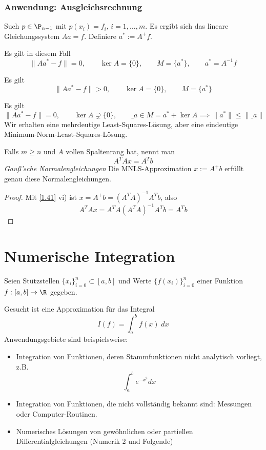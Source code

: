 \documentclass[11pt]{scrartcl}
\begin{document}
\subsubsection{Anwendung: Ausgleichsrechnung}

Such $p\in \P_{n-1}$ mit $p(x_i)=f_i$, $i=1,\dotsc,m$.
Es ergibt sich das lineare Gleichungssystem $Aa = f$.
Definiere $a^* := A^+f$.

\begin{seg}[$m=n$ (Polynominterpolation)]
	Es gilt in diesem Fall
	\[
		\|Aa^*-f\| = 0, \qquad \ker A = \{0\}, \qquad M = \{a^*\}, \qquad a^* = A^{-1}f
	\]
\end{seg}
\begin{seg}[$m>n$]
	Es gilt
	\[
		\|Aa^*-f\| > 0, \qquad \ker A = \{0\}, \qquad M = \{a^*\}
	\]
\end{seg}
\begin{seg}[$m<n$]
	Es gilt
	\[
		\|Aa^*-f\| = 0, \qquad \ker A \supsetneq \{0\}, \qquad \_a \in M = a^* + \ker A \implies \|a^*\| \le \|\_a\|
	\]
	Wir erhalten eine mehrdeutige Least-Squares-Lösung, aber eine eindeutige Minimum-Norm-Least-Squares-Lösung.
\end{seg}
\begin{nt*}
	Falls $m\ge n$ und $A$ vollen Spaltenrang hat, nennt man
	\[
		A^TAx = A^Tb
	\]
	\emph{Gauß'sche Normalengleichungen}
	Die MNLS-Approximation $x:=A^+b$ erfüllt genau diese Normalengleichungen.
	\begin{proof}
		Mit \ref{1.41} vi) ist $x=A^+b = (A^TA)^{-1}A^Tb$, also
		\[
			A^TAx = A^TA(A^TA)^{-1}A^T b = A^Tb
		\]
	\end{proof}
\end{nt*}



\section{Numerische Integration}	



Seien Stützstellen $\{x_i\}_{i=0}^n \subset [a,b]$ und Werte $\{f(x_i)\}_{i=0}^n$ einer Funktion $f:[a,b]\to \R$ gegeben.

Gesucht ist eine Approximation für das Integral
\[
	I(f) = \int_a^b f(x) \;dx
\]
Anwendungsgebiete sind beispielsweise:
\begin{itemize}
	\item
		Integration von Funktionen, deren Stammfunktionen nicht analytisch vorliegt, z.B.
		\[
			\int_a^b e^{-x^2} dx
		\]
	\item
		Integration von Funktionen, die nicht vollständig bekannt sind: Messungen oder Computer-Routinen.
	\item
		Numerisches Lösungen von gewöhnlichen oder partiellen Differentialgleichungen (Numerik 2 und Folgende)
\end{itemize}
\end{document}
